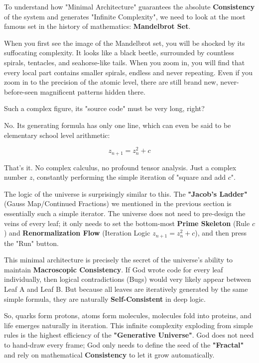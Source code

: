 To understand how "Minimal Architecture" guarantees the absolute \textbf{Consistency} of the system and generates "Infinite Complexity", we need to look at the most famous set in the history of mathematics: \textbf{Mandelbrot Set}.

When you first see the image of the Mandelbrot set, you will be shocked by its suffocating complexity. It looks like a black beetle, surrounded by countless spirals, tentacles, and seahorse-like tails. When you zoom in, you will find that every local part contains smaller spirals, endless and never repeating. Even if you zoom in to the precision of the atomic level, there are still brand new, never-before-seen magnificent patterns hidden there.

Such a complex figure, its "source code" must be very long, right?

No. Its generating formula has only one line, which can even be said to be elementary school level arithmetic:

\[z_{n+1} = z_n^2 + c\]

That's it. No complex calculus, no profound tensor analysis. Just a complex number $z$, constantly performing the simple iteration of "square and add $c$".

The logic of the universe is surprisingly similar to this. The \textbf{"Jacob's Ladder"} (Gauss Map/Continued Fractions) we mentioned in the previous section is essentially such a simple iterator. The universe does not need to pre-design the veins of every leaf; it only needs to set the bottom-most \textbf{Prime Skeleton} (Rule $c$) and \textbf{Renormalization Flow} (Iteration Logic $z_{n+1} = z_n^2 + c$), and then press the "Run" button.

This minimal architecture is precisely the secret of the universe's ability to maintain \textbf{Macroscopic Consistency}. If God wrote code for every leaf individually, then logical contradictions (Bugs) would very likely appear between Leaf A and Leaf B. But because all leaves are iteratively generated by the same simple formula, they are naturally \textbf{Self-Consistent} in deep logic.

So, quarks form protons, atoms form molecules, molecules fold into proteins, and life emerges naturally in iteration. This infinite complexity exploding from simple rules is the highest efficiency of the \textbf{"Generative Universe"}. God does not need to hand-draw every frame; God only needs to define the seed of the \textbf{"Fractal"} and rely on mathematical \textbf{Consistency} to let it grow automatically.


